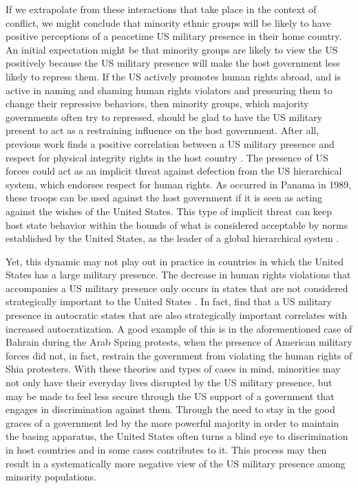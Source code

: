 If we extrapolate from these interactions that take place in the context of conflict, we might conclude that minority ethnic groups will be likely to have positive perceptions of a peacetime US military presence in their home country.  An initial expectation might be that minority groups are likely to view the US positively because the US military presence will make the host government less likely to repress them. If the US actively promotes human rights abroad, and is active in naming and shaming human rights violators and pressuring them to change their repressive behaviors, then minority groups, which majority governments often try to repressed, should be glad to have the US military present to act as a restraining influence on the host government. After all, previous work finds a positive correlation between a US military presence and respect for physical integrity rights in the host country \cite{bell2017}. The presence of US forces could act as an implicit threat against defection from the US hierarchical system, which endorses respect for human rights. As occurred in Panama in 1989, these troops can be used against the host government if it is seen as acting against the wishes of the United States. This type of implicit threat can keep host state behavior within the bounds of what is considered acceptable by norms established by the United States, as the leader of a global hierarchical system \cite{Towns2012}. 


Yet, this dynamic may not play out in practice in countries in which the United States has a large military presence. The decrease in human rights violations that accompanies a US military presence only occurs in states that are not considered strategically important to the United States \cite{bell2017}. In fact,  find that a US military presence in autocratic states that are also strategically important correlates with increased autocratization. A good example of this is in the aforementioned case of Bahrain during the Arab Spring protests, when the presence of American military forces did not, in fact, restrain the government from violating the human rights of Shia protesters. With these theories and types of cases in mind, minorities may not only have their everyday lives disrupted by the US military presence, but may be made to feel less secure through the US support of a government that engages in discrimination against them. Through the need to stay in the good graces of a government led by the more powerful majority in order to maintain the basing apparatus, the United States often turns a blind eye to discrimination in host countries and in some cases contributes to it. This process may then result in a systematically more negative view of the US military presence among minority populations. 

